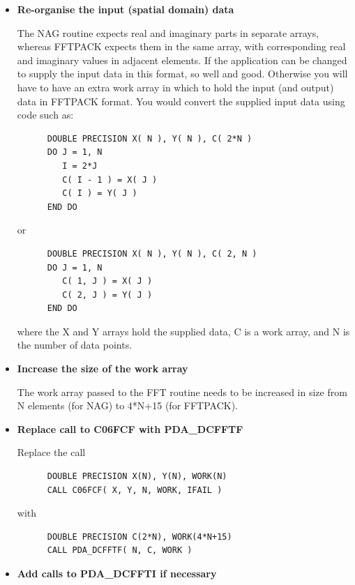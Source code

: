 \documentclass[11pt,twoside]{article}
\newcommand{\htmlref}[2]{#1}
\begin{document}
\begin{itemize}

\item{\bf Re-organise the input (spatial domain) data}

   The NAG routine expects real and imaginary parts in separate arrays,
   whereas FFTPACK expects them in the same array, with corresponding
   real and imaginary values in adjacent elements. If the application
   can be changed to supply the input data in this format, so well and
   good. Otherwise you will have to have an extra work array in which to
   hold the input (and output) data in FFTPACK format. You would convert
   the supplied input data using code such as:

\begin{verbatim}
      DOUBLE PRECISION X( N ), Y( N ), C( 2*N )
      DO J = 1, N
         I = 2*J
         C( I - 1 ) = X( J )
         C( I ) = Y( J )
      END DO
\end{verbatim}

   or

\begin{verbatim}
      DOUBLE PRECISION X( N ), Y( N ), C( 2, N )
      DO J = 1, N
         C( 1, J ) = X( J )
         C( 2, J ) = Y( J )
      END DO
\end{verbatim}

   where the X and Y arrays hold the supplied data, C is a work array,
   and N is the number of data points.

\item{\bf Increase the size of the work array}

   The work array passed to the FFT routine needs to be increased in
   size from N elements (for NAG) to 4*N+15 (for FFTPACK).

\item{\bf Replace call to C06FCF with
\htmlref{PDA\_DCFFTF}{PDA\_CFFTF}}

   Replace the call

\begin{verbatim}
      DOUBLE PRECISION X(N), Y(N), WORK(N)
      CALL C06FCF( X, Y, N, WORK, IFAIL )
\end{verbatim}

   with

\begin{verbatim}
      DOUBLE PRECISION C(2*N), WORK(4*N+15)
      CALL PDA_DCFFTF( N, C, WORK )
\end{verbatim}

\item{\bf Add calls to
\htmlref{PDA\_DCFFTI}{PDA\_CFFTI}
   if necessary}


\end{itemize}
\end{document}
